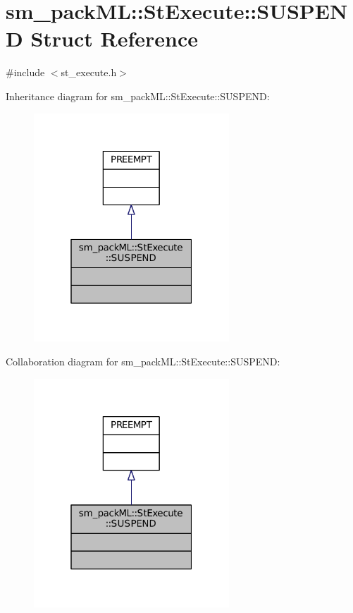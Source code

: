 \hypertarget{structsm__packML_1_1StExecute_1_1SUSPEND}{}\section{sm\+\_\+pack\+ML\+:\+:St\+Execute\+:\+:S\+U\+S\+P\+E\+ND Struct Reference}
\label{structsm__packML_1_1StExecute_1_1SUSPEND}


{\ttfamily \#include $<$st\+\_\+execute.\+h$>$}



Inheritance diagram for sm\+\_\+pack\+ML\+:\+:St\+Execute\+:\+:S\+U\+S\+P\+E\+ND\+:
\nopagebreak
\begin{figure}[H]
\begin{center}
\leavevmode
\includegraphics[width=208pt]{structsm__packML_1_1StExecute_1_1SUSPEND__inherit__graph}
\end{center}
\end{figure}


Collaboration diagram for sm\+\_\+pack\+ML\+:\+:St\+Execute\+:\+:S\+U\+S\+P\+E\+ND\+:
\nopagebreak
\begin{figure}[H]
\begin{center}
\leavevmode
\includegraphics[width=208pt]{structsm__packML_1_1StExecute_1_1SUSPEND__coll__graph}
\end{center}
\end{figure}


